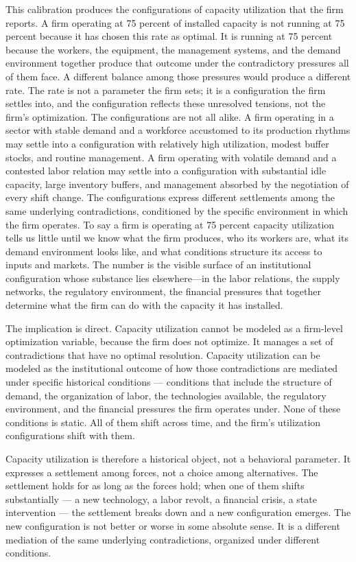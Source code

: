 This calibration produces the configurations of capacity utilization that the firm reports. A firm operating at 75 percent of installed capacity is not running at 75 percent because it has chosen this rate as optimal. It is running at 75 percent because the workers, the equipment, the management systems, and the demand environment together produce that outcome under the contradictory pressures all of them face. A different balance among those pressures would produce a different rate. The rate is not a parameter the firm sets; it is a configuration the firm settles into, and the configuration reflects these unresolved tensions, not the firm's optimization. The configurations are not all alike. A firm operating in a sector with stable demand and a workforce accustomed to its production rhythms may settle into a configuration with relatively high utilization, modest buffer stocks, and routine management. A firm operating with volatile demand and a contested labor relation may settle into a configuration with substantial idle capacity, large inventory buffers, and management absorbed by the negotiation of every shift change. The configurations express different settlements among the same underlying contradictions, conditioned by the specific environment in which the firm operates. To say a firm is operating at 75 percent capacity utilization tells us little until we know what the firm produces, who its workers are, what its demand environment looks like, and what conditions structure its access to inputs and markets. The number is the visible surface of an institutional configuration whose substance lies elsewhere—in the labor relations, the supply networks, the regulatory environment, the financial pressures that together determine what the firm can do with the capacity it has installed.

The implication is direct. Capacity utilization cannot be modeled as a firm-level optimization variable, because the firm does not optimize. It manages a set of contradictions that have no optimal resolution. Capacity utilization can be modeled as the institutional outcome of how those contradictions are mediated under specific historical conditions — conditions that include the structure of demand, the organization of labor, the technologies available, the regulatory environment, and the financial pressures the firm operates under. None of these conditions is static. All of them shift across time, and the firm's utilization configurations shift with them.

Capacity utilization is therefore a historical object, not a behavioral parameter. It expresses a settlement among forces, not a choice among alternatives. The settlement holds for as long as the forces hold; when one of them shifts substantially — a new technology, a labor revolt, a financial crisis, a state intervention — the settlement breaks down and a new configuration emerges. The new configuration is not better or worse in some absolute sense. It is a different mediation of the same underlying contradictions, organized under different conditions.

